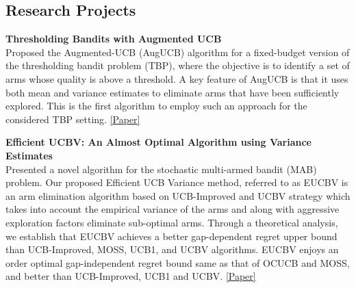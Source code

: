 \documentclass[margin,11pt]{res}
\begin{document}
\begin{resume}
\section{Research Projects}
\par 

\textbf{Thresholding Bandits with Augmented UCB}\\
Proposed the Augmented-UCB (AugUCB) algorithm for a fixed-budget version of the thresholding bandit problem (TBP), where the objective is to identify a set of arms whose quality is above a threshold. A key feature of AugUCB is that it uses both mean and variance estimates to eliminate arms that have been sufficiently explored. This is the first algorithm to employ such an approach for the considered TBP setting. \href{https://www.ijcai.org/proceedings/2017/0350.pdf}{[Paper]}
\par

\textbf{Efficient UCBV: An Almost Optimal Algorithm using Variance Estimates}\\
Presented a novel algorithm for the stochastic multi-armed bandit (MAB) problem. Our proposed Efficient UCB Variance method, referred to as EUCBV is an arm elimination algorithm based on UCB-Improved and UCBV strategy which takes into account the empirical variance of the arms and along with aggressive exploration factors eliminate sub-optimal arms. Through a theoretical analysis, we establish that EUCBV achieves a better gap-dependent regret upper bound than UCB-Improved, MOSS, UCB1, and UCBV algorithms. EUCBV enjoys an order optimal gap-independent regret bound same as that of OCUCB and MOSS, and better than UCB-Improved, UCB1 and UCBV. \href{https://www.aaai.org/ocs/index.php/AAAI/AAAI18/paper/view/16111}{[Paper]}
\par


\end{resume}
\end{document}
